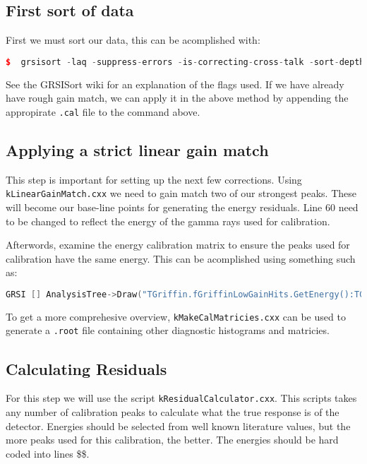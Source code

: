 \documentclass[10pt]{article} %
\begin{document}
\subsection{First sort of data}
First we must sort our data, this can be acomplished with:

\begin{lstlisting}[language=c++]
$  grsisort -laq -suppress-errors -is-correcting-cross-talk -sort-depth=70000000 /dir/to/midas/file
\end{lstlisting}

See the GRSISort wiki for an explanation of the flags used.
If we have already have rough gain match, we can apply it in the above method by appending the appropirate \texttt{.cal} file to the command above.

\subsection{Applying a strict linear gain match}

This step is important for setting up the next few corrections.
Using \texttt{kLinearGainMatch.cxx} we need to gain match two of our strongest peaks.
These will become our base-line points for generating the energy residuals.
Line 60 need to be changed to reflect the energy of the gamma rays used for calibration.

Afterwords, examine the energy calibration matrix to ensure the peaks used for calibration have the same energy.
This can be acomplished using something such as:

\begin{lstlisting}[language=c++]
GRSI [] AnalysisTree->Draw("TGriffin.fGriffinLowGainHits.GetEnergy():TGriffin.fGriffinLowGainHits.GetChannel().fNumber>>h(64,0,64,4000,0,4000)","TSceptar.GetMultiplicity()>0","colz")
\end{lstlisting}

To get a more comprehesive overview, \texttt{kMakeCalMatricies.cxx} can be used to generate a \texttt{.root} file containing other diagnostic histograms and matricies.

\subsection{Calculating Residuals}

For this step we will use the script \texttt{kResidualCalculator.cxx}.
This scripts takes any number of calibration peaks to calculate what the true response is of the detector.
Energies should be selected from well known literature values, but the more peaks used for this calibration, the better.
The energies should be hard coded into lines \$\$.
\end{document}
